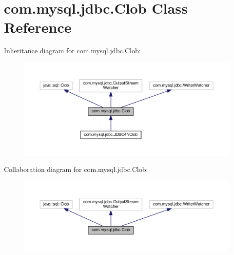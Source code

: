 \hypertarget{classcom_1_1mysql_1_1jdbc_1_1_clob}{}\section{com.\+mysql.\+jdbc.\+Clob Class Reference}
\label{classcom_1_1mysql_1_1jdbc_1_1_clob}


Inheritance diagram for com.\+mysql.\+jdbc.\+Clob\+:\nopagebreak
\begin{figure}[H]
\begin{center}
\leavevmode
\includegraphics[width=350pt]{classcom_1_1mysql_1_1jdbc_1_1_clob__inherit__graph}
\end{center}
\end{figure}


Collaboration diagram for com.\+mysql.\+jdbc.\+Clob\+:\nopagebreak
\begin{figure}[H]
\begin{center}
\leavevmode
\includegraphics[width=350pt]{classcom_1_1mysql_1_1jdbc_1_1_clob__coll__graph}
\end{center}
\end{figure}
